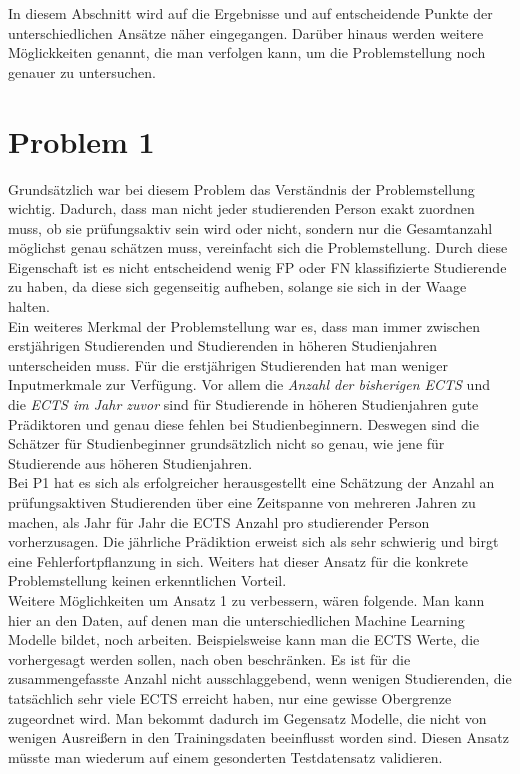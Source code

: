 In diesem Abschnitt wird auf die Ergebnisse und auf entscheidende Punkte der unterschiedlichen Ans\"atze n\"aher eingegangen. 
Dar\"uber hinaus werden weitere M\"oglickkeiten genannt, die man verfolgen kann, um die Problemstellung noch genauer zu untersuchen. \\






\section{Problem 1}

Grunds\"atzlich war bei diesem Problem das Verst\"andnis der Problemstellung wichtig. Dadurch, dass man nicht jeder studierenden Person exakt zuordnen muss, 
ob sie pr\"ufungsaktiv sein wird oder nicht, sondern nur die Gesamtanzahl m\"oglichst genau sch\"atzen muss, vereinfacht sich die Problemstellung. 
Durch diese Eigenschaft ist es nicht entscheidend wenig FP oder FN klassifizierte Studierende zu haben, da diese sich gegenseitig aufheben, solange sie sich in der 
Waage halten. \\

Ein weiteres Merkmal der Problemstellung war es, dass man immer zwischen erstj\"ahrigen Studierenden und Studierenden in h\"oheren Studienjahren unterscheiden muss. 
F\"ur die erstj\"ahrigen Studierenden hat man weniger Inputmerkmale zur Verf\"ugung. Vor allem die \textit{Anzahl der bisherigen ECTS} und die \textit{ECTS im Jahr zuvor} sind f\"ur 
Studierende in h\"oheren Studienjahren gute Pr\"adiktoren und genau diese fehlen bei Studienbeginnern. Deswegen sind die Sch\"atzer f\"ur Studienbeginner grunds\"atzlich 
nicht so genau, wie jene f\"ur Studierende aus h\"oheren Studienjahren. \\

Bei P1 hat es sich als erfolgreicher herausgestellt eine Sch\"atzung der Anzahl an pr\"ufungsaktiven Studierenden \"uber eine Zeitspanne von mehreren 
Jahren zu machen, als Jahr f\"ur Jahr die ECTS Anzahl pro studierender Person vorherzusagen. Die j\"ahrliche Pr\"adiktion erweist sich als 
sehr schwierig und birgt eine Fehlerfortpflanzung in sich. Weiters hat dieser Ansatz f\"ur die konkrete Problemstellung keinen erkenntlichen Vorteil. \\

Weitere M\"oglichkeiten um Ansatz 1 zu verbessern, w\"aren folgende. Man kann hier an den Daten, auf denen man die unterschiedlichen Machine Learning 
Modelle bildet, noch arbeiten. Beispielsweise kann man die ECTS Werte, die vorhergesagt werden sollen, nach oben beschr\"anken. Es ist f\"ur die 
zusammengefasste Anzahl nicht ausschlaggebend, wenn wenigen Studierenden, die tats\"achlich sehr viele ECTS erreicht haben, nur eine gewisse Obergrenze zugeordnet wird. 
Man bekommt dadurch im Gegensatz Modelle, die nicht von wenigen Ausrei{\ss}ern in den Trainingsdaten beeinflusst worden sind. Diesen Ansatz m\"usste man wiederum 
auf einem gesonderten Testdatensatz validieren. \\

